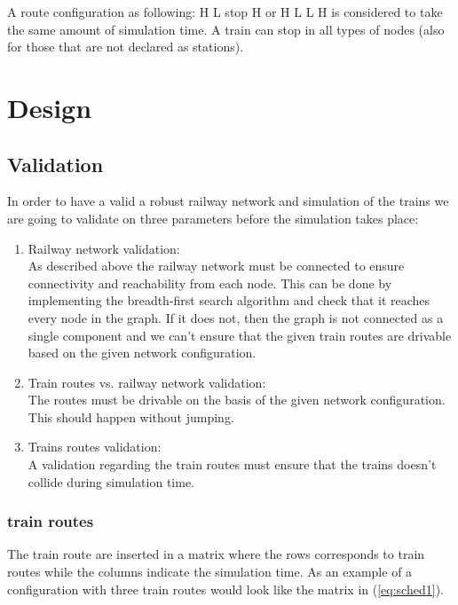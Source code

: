 \documentclass[10pt,a4paper]{article}
\begin{document}
A route configuration as following: H L stop H or H L L H is considered to take the same amount of simulation time. A train can stop in all types of nodes (also for those that are not declared as stations).

\section{Design}
\subsection{Validation}
 
In order to have a valid a robust railway network and simulation of the trains we are going to validate on three parameters before the simulation takes place:
\begin{enumerate}
\item Railway network validation: \\
      As described above the railway network must be connected to ensure connectivity and reachability from each node. This can be done by implementing the breadth-first search algorithm and check that it reaches every node in the graph. If it does not, then the graph is not connected as a single component and we can’t ensure that the given train routes are drivable based on the given network configuration.
 
\item Train routes vs. railway network validation: \\
      The routes must be drivable on the basis of the given network configuration. This should happen without jumping.
 
\item Trains routes validation: \\
      A validation regarding the train routes must ensure that the trains doesn’t collide during simulation time. 

\end{enumerate}
  
\subsubsection{train routes}
 
The train route are inserted in a matrix where the rows corresponds to train routes while the columns indicate the simulation time.
As an example of a configuration with three train routes would look like the matrix in (\ref{eq:sched1}).
\end{document}
